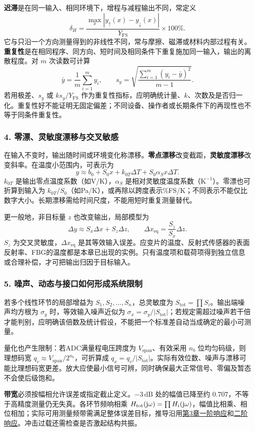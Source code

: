 \textbf{迟滞}是在同一输入、相同环境下，增程与减程输出不同，常定义
\[
\delta_H=\frac{\max_x|y_{\uparrow}(x)-y_{\downarrow}(x)|}
{Y_{\mathrm{FS}}}\times100\%.
\]
它与只沿一个方向测量得到的非线性不同，常与摩擦、磁滞或材料内部过程有关。\textbf{重复性}是在相同程序、同方向、短时间及相同条件下重复施加同一输入，输出的离散程度。对 $m$ 次读数可计算
\[
\bar y=\frac1m\sum_{i=1}^{m}y_i,\qquad
s_y=\sqrt{\frac{\sum_{i=1}^{m}(y_i-\bar y)^2}{m-1}}.
\]
若用极差、$s_y$ 或 $ks_y/Y_{\mathrm{FS}}$ 作为重复性指标，应明确统计量、$k$、次数及是否归一化。重复性好不能证明无固定偏差；不同设备、操作者或长期条件下的再现性也不等于同条件重复性。

\subsubsection*{4. 零漂、灵敏度漂移与交叉敏感}
在输入不变时，输出随时间或环境变化称漂移。\textbf{零点漂移}改变截距，\textbf{灵敏度漂移}改变斜率。在温度小范围内，可表示为
\[
y\approx b_0+S_0x+k_{0T}\Delta T+S_0\alpha_Sx\Delta T.
\]
$k_{0T}$ 是输出零点温度系数（如V/K），$\alpha_S$ 是相对灵敏度温度系数（$\mathrm K^{-1}$）。零漂也可折算到输入为 $k_{0T}/S_0$（如Pa/K），或再除以跨度表示\%FS/K；不同表示不能仅比数字大小。长期漂移需给时间尺度，不能用短时重复测量替代。

更一般地，非目标量 $z$ 也改变输出，局部模型为
\[
\Delta y\approx S_x\Delta x+S_z\Delta z,
\qquad \Delta x_{\mathrm{eq}}=\frac{S_z}{S_x}\Delta z.
\]
$S_z$ 为交叉灵敏度，$\Delta x_{\mathrm{eq}}$ 是其等效输入误差。应变片的温度、反射式传感器的表面反射率、FBG的温度都是本章已出现的实例。只有温度项和载荷项得到独立信息或合理补偿，才可把输出归因于目标输入。

\subsubsection*{5. 噪声、动态与接口如何形成系统限制}
若多个线性环节的局部增益为 $S_1,S_2,\ldots,S_n$，总灵敏度为 $S_{\mathrm{tot}}=\prod S_i$。输出端噪声均方根为 $\sigma_y$ 时，等效输入噪声近似为 $\sigma_x=\sigma_y/|S_{\mathrm{tot}}|$；若规定需超过噪声若干倍才能判别，应明确该倍数及统计假设，不能把一个标准差自动当成确定的最小可测量。

量化也产生限制：若ADC满量程电压跨度为 $V_{\mathrm{span}}$、有效采用 $n_b$ 位均匀码级，则理想码宽 $q_v\approx V_{\mathrm{span}}/2^{n_b}$，可折算成 $q_x=q_v/|S_{\mathrm{tot}}|$。实际有效位数、噪声与漂移可能比理想码宽更差。放大应使最小信号可辨，同时确保最大正常信号、零偏及暂态不会使后级饱和。

\textbf{带宽}必须按幅相允许误差或指定截止定义。$-3\,\mathrm{dB}$ 处的幅值已降至约 $0.707$，不等于高精度测量仍无失真。各环节频响相乘 $H_{\mathrm{tot}}(\mathrm{j}\omega)=\prod H_i(\mathrm{j}\omega)$，幅值比相乘、相位相加；实际可用测量频带需满足整体误差目标，推导沿用\hyperref[kn:3-1]{第3章一阶响应}和\hyperref[kn:3-3]{二阶响应}。冲击过载还需检查是否激起结构共振。

